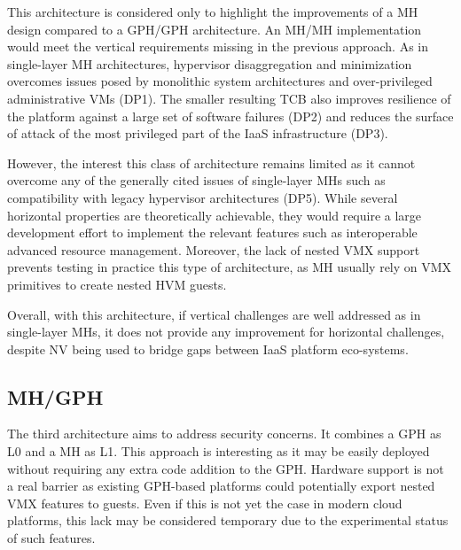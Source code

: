\documentclass{sig-alternate}
\begin{document}
\noindent This architecture is considered only to highlight the improvements of a MH design compared to a GPH/GPH architecture. An MH/MH implementation would meet the vertical requirements missing in the previous approach. 
As in single-layer MH architectures, hypervisor disaggregation and minimization overcomes issues posed by monolithic system architectures and over-privileged administrative VMs (DP1). The smaller resulting TCB also improves resilience of the platform against a large set of software failures (DP2) and reduces the surface of attack of the most privileged part of the IaaS infrastructure (DP3). 

However, the interest this class of architecture remains limited as it cannot overcome any of the generally cited issues of single-layer MHs such as compatibility with legacy hypervisor architectures (DP5). While several horizontal properties are theoretically achievable, they would require a large development effort to implement the relevant features such as interoperable advanced resource management. Moreover, the lack of nested VMX support prevents testing in practice this type of architecture, as MH usually rely on VMX primitives to create nested HVM guests.

Overall, with this architecture, if vertical challenges are well addressed as in single-layer MHs, it does not provide any improvement for horizontal challenges, despite NV being used to bridge gaps between IaaS platform eco-systems.

\subsection{MH/GPH}
\label{par:mog}

\noindent The third architecture aims to address security concerns. It combines a GPH as L0 and a MH as L1. 
This approach is interesting as it may be easily deployed without requiring any extra code addition to the GPH. Hardware support is not a real barrier as existing GPH-based platforms could potentially export nested VMX features to guests. Even if this is not yet the case in modern cloud platforms, this lack may be considered temporary due to the experimental status of such features.
\end{document}

